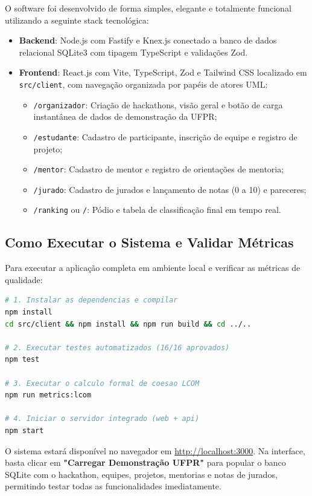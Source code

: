 \documentclass[12pt]{article}
\begin{document}
O software foi desenvolvido de forma simples, elegante e totalmente funcional utilizando a seguinte stack tecnológica:
\begin{itemize}
    \item \textbf{Backend}: Node.js com Fastify e Knex.js conectado a banco de dados relacional SQLite3 com tipagem TypeScript e validações Zod.
    \item \textbf{Frontend}: React.js com Vite, TypeScript, Zod e Tailwind CSS localizado em \texttt{src/client}, com navegação organizada por papéis de atores UML:
    \begin{itemize}
        \item \texttt{/organizador}: Criação de hackathons, visão geral e botão de carga instantânea de dados de demonstração da UFPR;
        \item \texttt{/estudante}: Cadastro de participante, inscrição de equipe e registro de projeto;
        \item \texttt{/mentor}: Cadastro de mentor e registro de orientações de mentoria;
        \item \texttt{/jurado}: Cadastro de jurados e lançamento de notas (0 a 10) e pareceres;
        \item \texttt{/ranking} ou \texttt{/}: Pódio e tabela de classificação final em tempo real.
    \end{itemize}
\end{itemize}

\subsection{Como Executar o Sistema e Validar Métricas}

Para executar a aplicação completa em ambiente local e verificar as métricas de qualidade:

\begin{lstlisting}[language=bash]
# 1. Instalar as dependencias e compilar
npm install
cd src/client && npm install && npm run build && cd ../..

# 2. Executar testes automatizados (16/16 aprovados)
npm test

# 3. Executar o calculo formal de coesao LCOM
npm run metrics:lcom

# 4. Iniciar o servidor integrado (web + api)
npm start
\end{lstlisting}

O sistema estará disponível no navegador em \url{http://localhost:3000}. Na interface, basta clicar em \textbf{"Carregar Demonstração UFPR"} para popular o banco SQLite com o hackathon, equipes, projetos, mentorias e notas de jurados, permitindo testar todas as funcionalidades imediatamente.
\end{document}
